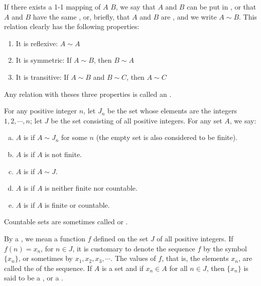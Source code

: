 \begin{definition}
	If there exists a 1-1 mapping of $A$ {} $B$, we say that $A$ and $B$ can be put in {}, or that $A$ and $B$ have the same {}, or, briefly, that $A$ and $B$ are {}, and we write $A \sim B$. This relation clearly has the following properties:
	\begin{enumerate}[]
		\item It is reflexive: $A \sim A$
		\item It is symmetric: If $A \sim B$, then $B \sim A$
		\item It is transitive: If $A \sim B$ and $B \sim C$, then $A \sim C$
	\end{enumerate}
	Any relation with theses three properties is called an {}.
\end{definition}

\begin{definition}
	For any positive integer $n$, let $J_n$ be the set whose elements are the integers $1,2,\cdots,n$; let $J$ be the set consisting of all positive integers. For any set $A$, we say:
	\begin{enumerate}[(a)]
		\item $A$ is {} if $A \sim J_n$ for some $n$ (the empty set is also considered to be finite).
		\item $A$ is {} if $A$ is not finite.
		\item $A$ is {} if $A \sim J$.
		\item $A$ is {} if $A$ is neither finite nor countable.
		\item $A$ is {} if $A$ is finite or countable.
	\end{enumerate}
	Countable sets are sometimes called {} or {}.
\end{definition}

\begin{definition}
	By a {}, we mean a function $f$ defined on the set $J$ of all positive integers. If $f(n) = x_n$, for $n \in J$, it is customary to denote the sequence $f$ by the symbol $\{x_n\}$, or sometimes by $x_1, x_2, x_3, \cdots$. The values of $f$, that is, the elements $x_n$, are called the {} of the sequence. If $A$ is a set and if $x_n \in A$ for all $n \in J$, then $\{x_n\}$ is said to be a {}, or a {}.
\end{definition}

